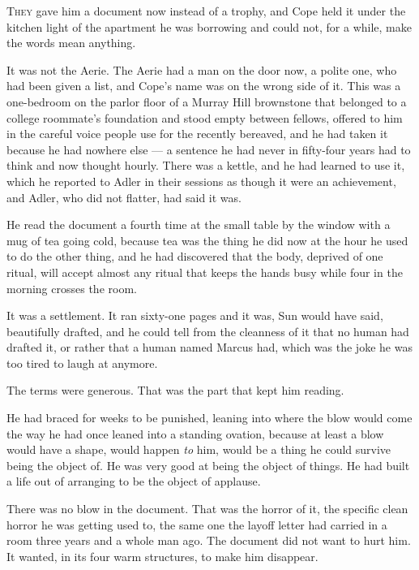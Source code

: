 \documentclass[11pt,openany]{book}
\newcommand{\scenebreak}{\par\vspace{0.5\baselineskip}\begin{center}\textasteriskcentered\quad\textasteriskcentered\quad\textasteriskcentered\end{center}\vspace{0.5\baselineskip}\par}
\begin{document}
\lettrine[lines=3, lhang=0.05, nindent=0.25em]{T}{hey} gave him a document now instead of a trophy, and Cope held it under the kitchen light of the apartment he was borrowing and could not, for a while, make the words mean anything.

It was not the Aerie. The Aerie had a man on the door now, a polite one, who had been given a list, and Cope's name was on the wrong side of it. This was a one-bedroom on the parlor floor of a Murray Hill brownstone that belonged to a college roommate's foundation and stood empty between fellows, offered to him in the careful voice people use for the recently bereaved, and he had taken it because he had nowhere else --- a sentence he had never in fifty-four years had to think and now thought hourly. There was a kettle, and he had learned to use it, which he reported to Adler in their sessions as though it were an achievement, and Adler, who did not flatter, had said it was.

He read the document a fourth time at the small table by the window with a mug of tea going cold, because tea was the thing he did now at the hour he used to do the other thing, and he had discovered that the body, deprived of one ritual, will accept almost any ritual that keeps the hands busy while four in the morning crosses the room.

It was a settlement. It ran sixty-one pages and it was, Sun would have said, beautifully drafted, and he could tell from the cleanness of it that no human had drafted it, or rather that a human named Marcus had, which was the joke he was too tired to laugh at anymore.

The terms were generous. That was the part that kept him reading.


\scenebreak


He had braced for weeks to be punished, leaning into where the blow would come the way he had once leaned into a standing ovation, because at least a blow would have a shape, would happen \textit{to} him, would be a thing he could survive being the object of. He was very good at being the object of things. He had built a life out of arranging to be the object of applause.

There was no blow in the document. That was the horror of it, the specific clean horror he was getting used to, the same one the layoff letter had carried in a room three years and a whole man ago. The document did not want to hurt him. It wanted, in its four warm structures, to make him disappear.
\end{document}
